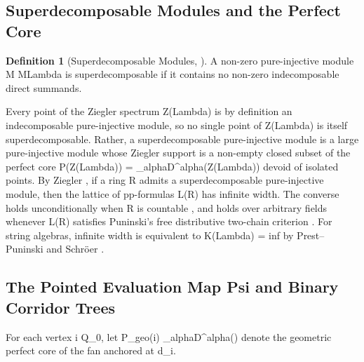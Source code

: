 \documentclass[11pt,a4paper,reqno]{amsart}
\def\({}%
\def\){}%
\def\mathcal#1{#1}%
\def\mathrm#1{#1}%
\def\operatorname#1{#1}%
\def\Zg{Z}%
\def\Mod{M}%
\def\KG{K}%
\def\Dgeo{D}%
\def\infty{inf}%
\def\alpha{alpha}%
\def\Psi{Psi}%
\def\Lambda{Lambda}%
\def\emph#1{#1}%
\theoremstyle{definition}
\newtheorem{definition}[theorem]{Definition}
\theoremstyle{remark}
\newcommand{\Mod}[1]{\operatorname{Mod}(#1)}
\newcommand{\Zg}{\operatorname{Zg}}
\newcommand{\KG}{\operatorname{KG}}
\newcommand{\Dgeo}{D_{\mathrm{geo}}}
\begin{document}
\subsection{Superdecomposable Modules and the Perfect Core}
\label{subsec:superdecomp_core}

\begin{definition}[Superdecomposable Modules, \cite{Ziegler1984, Krause1998, Prest2009}]
\label{def:superdecomposable}
A non-zero pure-injective module \(M \in \Mod{\Lambda}\) is \emph{superdecomposable} if it contains no non-zero indecomposable direct summands.
\end{definition}

Every point of the Ziegler spectrum \(\Zg(\Lambda)\) is by definition an indecomposable pure-injective module, so no single point of \(\Zg(\Lambda)\) is itself superdecomposable. Rather, a superdecomposable pure-injective module is a large pure-injective module whose Ziegler support is a non-empty closed subset of the perfect core \(\mathcal{P}(\Zg(\Lambda)) = \bigcap_\alpha D^\alpha(\Zg(\Lambda))\) devoid of isolated points. By Ziegler \cite[Theorem~7.8]{Ziegler1984}, if a ring \(R\) admits a superdecomposable pure-injective module, then the lattice of pp-formulas \(\mathcal{L}(R)\) has infinite width. The converse holds unconditionally when \(R\) is countable \cite[Theorem~7.8]{Ziegler1984}, and holds over arbitrary fields whenever \(\mathcal{L}(R)\) satisfies Puninski's free distributive two-chain criterion \cite[Theorem~2.3]{Puninski2008}. For string algebras, infinite width is equivalent to \(\KG(\Lambda) = \infty\) by Prest--Puninski \cite{PrestPuninski2002} and Schr\"oer \cite{Schroer2000b}.

\subsection{The Pointed Evaluation Map \(\Psi\) and Binary Corridor Trees}
\label{subsec:evaluation_map_psi}

For each vertex \(i \in Q_0\), let \(\mathcal{P}_{\mathrm{geo}}(i) \coloneqq \bigcap_\alpha \Dgeo^\alpha(\overline{\mathcal{F}_i})\) denote the geometric perfect core of the fan anchored at \(d_i\).
\end{document}
